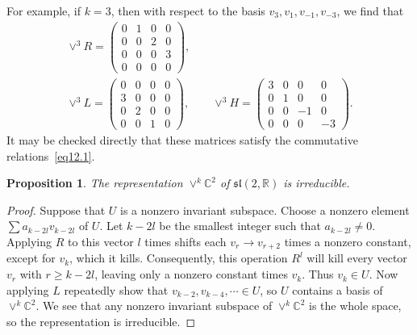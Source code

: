 \documentclass[12pt,reqno]{book}%
\newtheorem{proposition}{Proposition}[chapter]
\theoremstyle{definition}
\theoremstyle{remark}
\theoremstyle{theorem}
\theoremstyle{remark}
\begin{document}
For example, if $k = 3$, then with respect to the basis $v_3, v_1, v_{-1}, v_{-3}$, we find that
\begin{gather*}
    \vee^3R = \begin{pmatrix}
        0 & 1 & 0 & 0 \\
        0 & 0 & 2 & 0 \\
        0 & 0 & 0 & 3 \\
        0 & 0 & 0 & 0
    \end{pmatrix}, \\
    \vee^3L = \begin{pmatrix}
        0 & 0 & 0 & 0 \\
        3 & 0 & 0 & 0 \\
        0 & 2 & 0 & 0 \\
        0 & 0 & 1 & 0
    \end{pmatrix}, \qquad \vee^3H = \begin{pmatrix}
        3 & 0 & 0 & 0 \\
        0 & 1 & 0 & 0 \\
        0 & 0 & -1 & 0 \\
        0 & 0 & 0 & -3
    \end{pmatrix}.
\end{gather*}
It may be checked directly that these matrices satisfy the commutative relations~\eqref{eq12.1}.

\begin{proposition}\label{prop12.1}%
    The representation $\vee^k\mathbb{C}^2$ of $\mathfrak{sl}(2, \mathbb{R})$ is irreducible.
\end{proposition}%
\begin{proof}%
    Suppose that $U$ is a nonzero invariant subspace.
    Choose a nonzero element $\sum a_{k - 2l}v_{k - 2l}$ of $U$.
    Let $k - 2l$ be the smallest integer such that $a_{k - 2l} \neq 0$.
    Applying $R$ to this vector $l$ times shifts each $v_r \to v_{r + 2}$ times a nonzero constant, except for $v_k$, which it kills.
    Consequently, this operation $R^l$ will kill every vector $v_r$ with $r \geq k - 2l$, leaving only a nonzero constant times $v_k$.
    Thus $v_k \in U$.
    Now applying $L$ repeatedly show that $v_{k - 2}, v_{k - 4}, \cdots \in U$, so $U$ contains a basis of $\vee^k\mathbb{C}^2$.
    We see that any nonzero invariant subspace of $\vee^k\mathbb{C}^2$ is the whole space, so the representation is irreducible.
\end{proof}%
\end{document}
